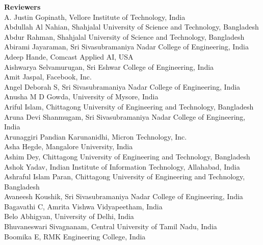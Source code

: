 \documentclass[11pt,oneside]{book}
\begin{document}
\begin{description}
  \item{\bf Reviewers}\vspace{2mm}\\
                    A. Justin Gopinath, Vellore Institute of Technology, India\\
              Abdullah Al Nahian, Shahjalal University of Science and Technology, Bangladesh\\
              Abdur Rahman, Shahjalal University of Science and Technology, Bangladesh\\
              Abirami Jayaraman, Sri Sivasubramaniya Nadar College of Engineering, India\\
              Adeep Hande, Comcast Applied AI, USA\\
              Aishwarya Selvamurugan, Sri Eshwar College of Engineering, India\\
              Amit Jaspal, Facebook, Inc.\\
              Angel Deborah S, Sri Sivasubramaniya Nadar College of Engineering, India\\
              Anusha M D Gowda, University of Mysore, India\\
              Ariful Islam, Chittagong University of Engineering and Technology, Bangladesh\\
              Aruna Devi Shanmugam, Sri Sivasubramaniya Nadar College of Engineering, India\\
              Arunaggiri Pandian Karunanidhi, Micron Technology, Inc.\\
              Asha Hegde, Mangalore University, India\\
              Ashim Dey, Chittagong University of Engineering and Technology, Bangladesh\\
              Ashok Yadav, Indian Institute of Information Technology, Allahabad, India\\
              Ashraful Islam Paran, Chittagong University of Engineering and Technology, Bangladesh\\
              Avaneesh Koushik, Sri Sivasubramaniya Nadar College of Engineering, India\\
              Bagavathi C, Amrita Vishwa Vidyapeetham, India\\
              Belo Abhigyan, University of Delhi, India\\
              Bhuvaneswari Sivagnanam, Central University of Tamil Nadu, India\\
              Boomika E, RMK Engineering College, India\\

\end{description}
\end{document}
